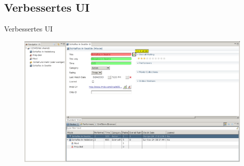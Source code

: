 \documentclass{beamer} %
\begin{document}
	\subsection{Verbessertes UI}
	\begin{frame}{Verbessertes UI}
		\begin{figure}[H] %
			\centering
			\includegraphics[width=\linewidth]{moviemanager_all_annotaded}
		\end{figure}
	\end{frame}

	\section{}
	\begin{frame}
	\end{frame}
\end{document}
